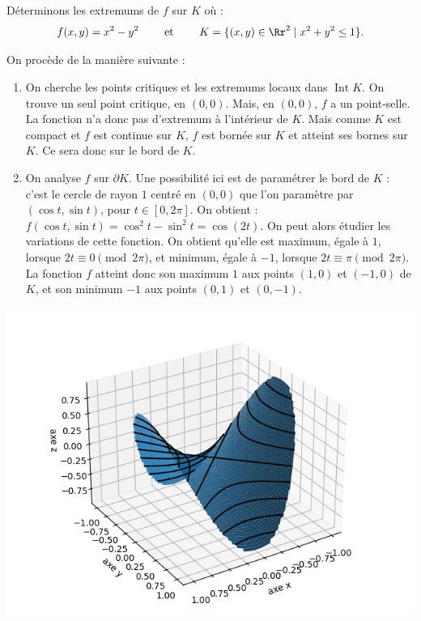 \begin{exemple}{}{}
Déterminons les extremums de $f$ sur $K$ où :
$$f(x,y) = x^2 - y^2 \qquad \text{ et } \qquad K = \lbrace (x,y) \in \Rr^2  \mid  x^2 + y^2 \leq 1 \rbrace.$$



On procède de la manière suivante :     
\begin{enumerate}
    \item On cherche les points critiques et les extremums locaux dans $\operatorname{Int} K$.
    On trouve un seul point critique, en $(0,0)$. Mais, en $(0,0)$, $f$ a un point-selle. La fonction n'a donc pas d'extremum à l'intérieur de $K$. Mais comme $K$ est compact et $f$ est continue sur $K$, $f$ est bornée sur $K$ et atteint ses bornes sur $K$. Ce sera donc sur le bord de $K$.
    
    \item On analyse $f$ sur $\partial K$.
    Une possibilité ici est de paramétrer le bord de $K$ : c'est le cercle de rayon $1$ centré en $(0,0)$ que l'on paramètre par $(\cos t,\sin t)$, pour $t\in[0,2\pi]$. On obtient :
    $f(\cos t,\sin t)=\cos^2t-\sin^2t=\cos(2t)$. On peut alors étudier les variations de cette fonction. On obtient qu'elle est maximum, égale à $1$, lorsque $2t \equiv 0 \pmod{2\pi}$, et minimum, égale à $-1$, lorsque $2t \equiv \pi \pmod{2\pi}$. La fonction $f$ atteint donc son maximum $1$ aux points $(1,0)$ et $(-1,0)$ de $K$, et son minimum $-1$ aux points $(0,1)$ et $(0,-1)$.
\end{enumerate}

\begin{center}
  \includegraphics[scale=\myscale,scale=0.6]{figures/fonctions-extrem-8}
\end{center}

\end{exemple}



